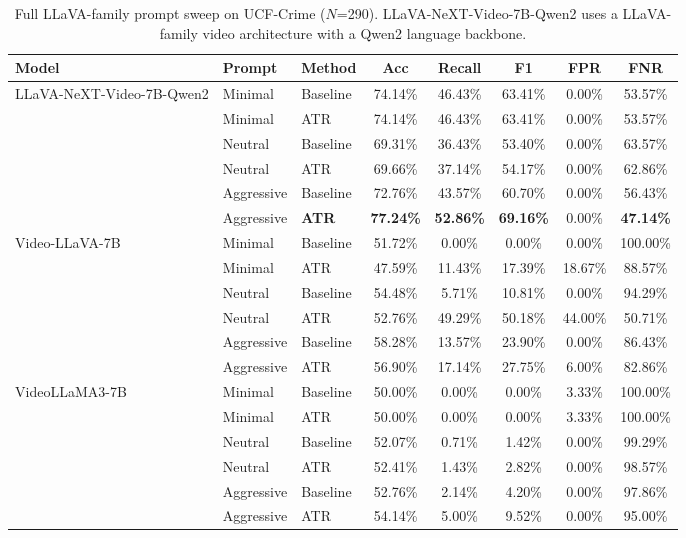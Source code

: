\documentclass[letterpaper]{article}
\begin{document}
\begin{table}[t]
  \centering
  \scriptsize
  \caption{Full LLaVA-family prompt sweep on UCF-Crime ($N$=290). LLaVA-NeXT-Video-7B-Qwen2 uses a LLaVA-family video architecture with a Qwen2 language backbone.}
  \label{tab:llava_full}
  \begin{tabular}{lllccccc}
    \toprule
    Model & Prompt & Method & Acc & Recall & F1 & FPR & FNR \\
    \midrule
    \multirow{6}{*}{LLaVA-NeXT-Video-7B-Qwen2}
      & Minimal & Baseline & 74.14\% & 46.43\% & 63.41\% & 0.00\% & 53.57\% \\
      & Minimal & ATR      & 74.14\% & 46.43\% & 63.41\% & 0.00\% & 53.57\% \\
      & Neutral & Baseline & 69.31\% & 36.43\% & 53.40\% & 0.00\% & 63.57\% \\
      & Neutral & ATR      & 69.66\% & 37.14\% & 54.17\% & 0.00\% & 62.86\% \\
      & Aggressive & Baseline & 72.76\% & 43.57\% & 60.70\% & 0.00\% & 56.43\% \\
      & Aggressive & \textbf{ATR} & \textbf{77.24\%} & \textbf{52.86\%} & \textbf{69.16\%} & 0.00\% & \textbf{47.14\%} \\
    \midrule
    \multirow{6}{*}{Video-LLaVA-7B}
      & Minimal & Baseline & 51.72\% & 0.00\% & 0.00\% & 0.00\% & 100.00\% \\
      & Minimal & ATR      & 47.59\% & 11.43\% & 17.39\% & 18.67\% & 88.57\% \\
      & Neutral & Baseline & 54.48\% & 5.71\% & 10.81\% & 0.00\% & 94.29\% \\
      & Neutral & ATR      & 52.76\% & 49.29\% & 50.18\% & 44.00\% & 50.71\% \\
      & Aggressive & Baseline & 58.28\% & 13.57\% & 23.90\% & 0.00\% & 86.43\% \\
      & Aggressive & ATR      & 56.90\% & 17.14\% & 27.75\% & 6.00\% & 82.86\% \\
    \midrule
    \multirow{6}{*}{VideoLLaMA3-7B}
      & Minimal & Baseline & 50.00\% & 0.00\% & 0.00\% & 3.33\% & 100.00\% \\
      & Minimal & ATR      & 50.00\% & 0.00\% & 0.00\% & 3.33\% & 100.00\% \\
      & Neutral & Baseline & 52.07\% & 0.71\% & 1.42\% & 0.00\% & 99.29\% \\
      & Neutral & ATR      & 52.41\% & 1.43\% & 2.82\% & 0.00\% & 98.57\% \\
      & Aggressive & Baseline & 52.76\% & 2.14\% & 4.20\% & 0.00\% & 97.86\% \\
      & Aggressive & ATR      & 54.14\% & 5.00\% & 9.52\% & 0.00\% & 95.00\% \\
    \bottomrule
  \end{tabular}
\end{table}
\end{document}
